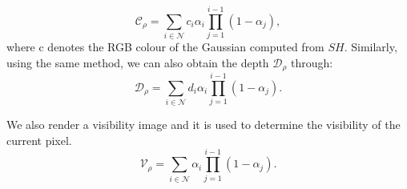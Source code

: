 \documentclass[lettersize,journal]{IEEEtran}
\begin{document}
\begin{equation}
\mathcal{C}_\rho=\sum_{i\in{\mathcal{N}}}{c}_{i}{\alpha}_{i}\prod_{j=1}^{i-1}(1-{\alpha}_{j}),
\label{eq:Crho}
\end{equation}
where c denotes the RGB colour of the Gaussian computed from $SH$.
Similarly, using the same method, we can also obtain the depth $\mathcal{D}_{\rho}$ through:
\begin{equation}
\mathcal{D}_\rho=\sum_{i\in{\mathcal{N}}}{d}_{i}{\alpha}_{i}\prod_{j=1}^{i-1}(1-{\alpha}_{j}).
\label{eq:Drho}
\end{equation}

We also render a visibility image and it is used to determine the visibility of the current pixel.
\begin{equation}
\mathcal{V}_{\rho}=\sum_{i\in{\mathcal{N}}}{\alpha}_{i}\prod_{j=1}^{i-1}(1-{\alpha}_{j}).
\label{eq:Vrho}
\end{equation}
\end{document}
